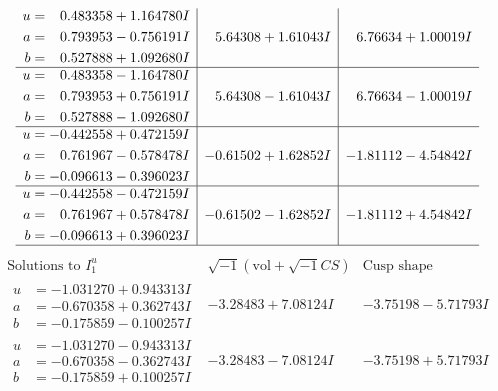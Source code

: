 \documentclass[1p]{elsarticle_modified}
\theoremstyle{definition}
\newcommand{\I}{\sqrt{-1}}
\begin{document}
$$\begin{array}{c|c|c}
\begin{aligned}
u &= \phantom{-}0.483358 + 1.164780 I \\
a &= \phantom{-}0.793953 - 0.756191 I \\
b &= \phantom{-}0.527888 + 1.092680 I\end{aligned}
 & \phantom{-}5.64308 + 1.61043 I & \phantom{-}6.76634 + 1.00019 I \\ \hline\begin{aligned}
u &= \phantom{-}0.483358 - 1.164780 I \\
a &= \phantom{-}0.793953 + 0.756191 I \\
b &= \phantom{-}0.527888 - 1.092680 I\end{aligned}
 & \phantom{-}5.64308 - 1.61043 I & \phantom{-}6.76634 - 1.00019 I \\ \hline\begin{aligned}
u &= -0.442558 + 0.472159 I \\
a &= \phantom{-}0.761967 - 0.578478 I \\
b &= -0.096613 - 0.396023 I\end{aligned}
 & -0.61502 + 1.62852 I & -1.81112 - 4.54842 I \\ \hline\begin{aligned}
u &= -0.442558 - 0.472159 I \\
a &= \phantom{-}0.761967 + 0.578478 I \\
b &= -0.096613 + 0.396023 I\end{aligned}
 & -0.61502 - 1.62852 I & -1.81112 + 4.54842 I\\
 \hline 
 \end{array}$$\newpage$$\begin{array}{c|c|c}  
\text{Solutions to }I^u_{1}& \I (\text{vol} + \sqrt{-1}CS) & \text{Cusp shape}\\
 \hline 
\begin{aligned}
u &= -1.031270 + 0.943313 I \\
a &= -0.670358 + 0.362743 I \\
b &= -0.175859 - 0.100257 I\end{aligned}
 & -3.28483 + 7.08124 I & -3.75198 - 5.71793 I \\ \hline\begin{aligned}
u &= -1.031270 - 0.943313 I \\
a &= -0.670358 - 0.362743 I \\
b &= -0.175859 + 0.100257 I\end{aligned}
 & -3.28483 - 7.08124 I & -3.75198 + 5.71793 I \\ \hline\begin{aligned}

\end{aligned}
\end{array}$$
\end{document}
